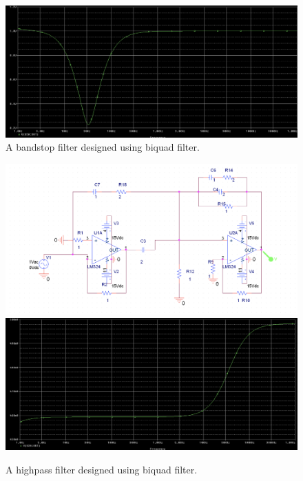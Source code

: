 \documentclass[11pt]{article}
\begin{document}
\begin{question}
\begin{subquestion}
{\begin{figure}[H]
\begin{center}
                    \includegraphics[scale=0.25]{Fig/Q6bb.png}
                    \caption{A bandstop filter designed using biquad filter.}
                \end{center}
            \end{figure}
            \begin{figure}[H]
                \begin{center}
                    \includegraphics[scale=0.3]{Fig/Q6ca.png}
                    \includegraphics[scale=0.25]{Fig/Q6cb.png}
                    \caption{A highpass filter designed using biquad filter.}
                \end{center}
            \end{figure}
}
\end{subquestion}
\end{question}
\end{document}
